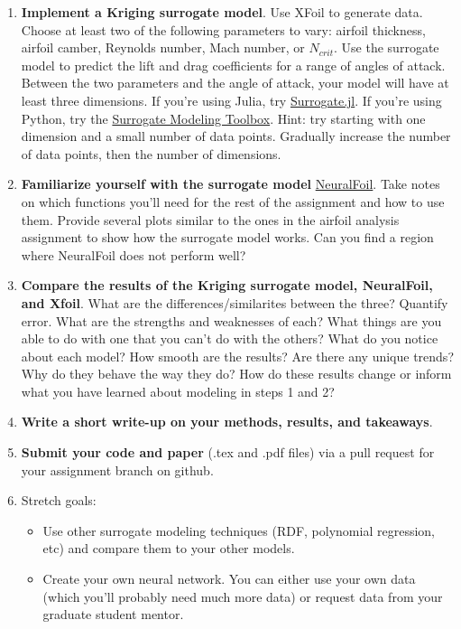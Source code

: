 \documentclass[12pt]{article}
\begin{document}
\begin{enumerate}
	\item \textbf{Implement a Kriging surrogate model}. Use XFoil to generate data. Choose at least two of the following parameters to vary: airfoil thickness, airfoil camber, Reynolds number, Mach number, or $N_{crit}$. Use the surrogate model to predict the lift and drag coefficients for a range of angles of attack. Between the two parameters and the angle of attack, your model will have at least three dimensions. If you're using Julia, try \href{https://docs.sciml.ai/Surrogates/stable/kriging/}{Surrogate.jl}. If you're using Python, try the \href{https://smt.readthedocs.io/en/latest/_src_docs/surrogate_models/gpr/krg.html}{Surrogate Modeling Toolbox}. Hint: try starting with one dimension and a small number of data points. Gradually increase the number of data points, then the number of dimensions. 
	\item \textbf{Familiarize yourself with the surrogate model} \href{https://github.com/peterdsharpe/NeuralFoil}{NeuralFoil}. Take notes on which functions you'll need for the rest of the assignment and how to use them. Provide several plots similar to the ones in the airfoil analysis assignment to show how the surrogate model works. Can you find a region where NeuralFoil does not perform well? 
	\item \textbf{Compare the results of the Kriging surrogate model, NeuralFoil, and Xfoil}. What are the differences/similarites between the three? Quantify error. What are the strengths and weaknesses of each? What things are you able to do with one that you can't do with the others? What do you notice about each model? How smooth are the results? Are there any unique trends? Why do they behave the way they do? How do these results change or inform what you have learned about modeling in steps 1 and 2?
	\item \textbf{Write a short write-up on your methods, results, and takeaways}. 
	\item \textbf{Submit your code and paper} (.tex and .pdf files) via a pull request for your assignment branch on github.
	\item Stretch goals:
	\begin{itemize}
		\item Use other surrogate modeling techniques (RDF, polynomial regression, etc) and compare them to your other models.
		\item Create your own neural network. You can either use your own data (which you'll probably need much more data) or request data from your graduate student mentor.
	\end{itemize}
\end{enumerate}
\end{document}
